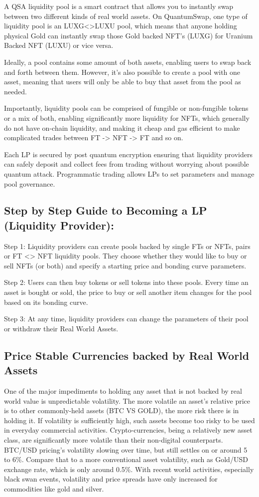 \documentclass[11pt]{article}
\begin{document}
A QSA liquidity pool is a smart contract that allows you to instantly swap between two different kinds of real world assets. On QuantumSwap, one type of liquidity pool is an LUXG<>LUXU pool, which means that anyone holding physical Gold can instantly swap those Gold backed NFT's (LUXG) for Uranium Backed NFT (LUXU) or vice versa.


Ideally, a pool contains some amount of both assets, enabling users to swap back and forth between them. However, it's also possible to create a pool with one asset, meaning that users will only be able to buy that asset from the pool as needed.


Importantly, liquidity pools can be comprised of fungible or non-fungible tokens or a mix of both, enabling significantly more liquidity for NFTs, which generally do not have on-chain liquidity, and making it cheap and gas efficient to make complicated trades between FT -> NFT -> FT and so on.


Each LP is secured by post quantum encryption ensuring that liquidity providers can safely deposit and collect fees from trading without worrying about possible quantum attack. Programmatic trading allows LPs to set parameters and manage pool governance.


\subsection{Step by Step Guide to Becoming a LP (Liquidity Provider):}

Step 1: Liquidity providers can create pools backed by single FTs or NFTs, pairs or FT <> NFT liquidity pools. They choose whether they would like to buy or sell NFTs (or both) and specify a starting price and bonding curve parameters.


Step 2: Users can then buy tokens or sell tokens into these pools. Every time an asset is bought or sold, the price to buy or sell another item changes for the pool based on its bonding curve.


Step 3: At any time, liquidity providers can change the parameters of their pool or withdraw their Real World Assets.


\subsection{Price Stable Currencies backed by Real World Assets}

One of the major impediments to holding any asset that is not backed by real world value is unpredictable volatility. The more volatile an asset's relative price is to other commonly-held assets (BTC VS GOLD), the more risk there is in holding it. If volatility is sufficiently high, such assets become too risky to be used in everyday commercial activities. Crypto-currencies, being a relatively new asset class, are significantly more volatile than their non-digital counterparts. BTC/USD pricing's volatility slowing over time, but still settles on or around 5 to 6\%. Compare that to a more conventional asset volatility, such as Gold/USD exchange rate, which is only around 0.5\%. With recent world activities, especially black swan events, volatility and price spreads have only increased for commodities like gold and silver.
\end{document}
